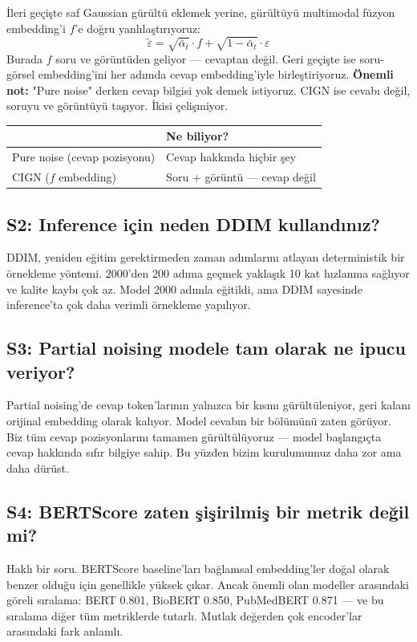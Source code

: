 \documentclass[12pt, a4paper]{article}
\begin{document}
İleri geçişte saf Gaussian gürültü eklemek yerine, gürültüyü multimodal füzyon embedding'i $f$'e doğru yanlılaştırıyoruz:
\[
\tilde{\varepsilon} = \sqrt{\bar{\alpha}_t} \cdot f + \sqrt{1-\bar{\alpha}_t} \cdot \varepsilon
\]
Burada $f$ soru ve görüntüden geliyor — cevaptan değil. Geri geçişte ise soru-görsel embedding'ini her adımda cevap embedding'iyle birleştiriyoruz. \textbf{Önemli not:} "Pure noise" derken cevap bilgisi yok demek istiyoruz. CIGN ise cevabı değil, soruyu ve görüntüyü taşıyor. İkisi çelişmiyor.

\begin{center}
\begin{tabular}{ll}
\toprule
& Ne biliyor? \\
\midrule
Pure noise (cevap pozisyonu) & Cevap hakkında hiçbir şey \\
CIGN ($f$ embedding) & Soru + görüntü — cevap değil \\
\bottomrule
\end{tabular}
\end{center}

\subsection*{S2: Inference için neden DDIM kullandınız?}

DDIM, yeniden eğitim gerektirmeden zaman adımlarını atlayan deterministik bir örnekleme yöntemi. 2000'den 200 adıma geçmek yaklaşık 10 kat hızlanma sağlıyor ve kalite kaybı çok az. Model 2000 adımla eğitildi, ama DDIM sayesinde inference'ta çok daha verimli örnekleme yapılıyor.

\subsection*{S3: Partial noising modele tam olarak ne ipucu veriyor?}

Partial noising'de cevap token'larının yalnızca bir kısmı gürültüleniyor, geri kalanı orijinal embedding olarak kalıyor. Model cevabın bir bölümünü zaten görüyor. Biz tüm cevap pozisyonlarını tamamen gürültülüyoruz — model başlangıçta cevap hakkında sıfır bilgiye sahip. Bu yüzden bizim kurulumumuz daha zor ama daha dürüst.

\subsection*{S4: BERTScore zaten şişirilmiş bir metrik değil mi?}

Haklı bir soru. BERTScore baseline'ları bağlamsal embedding'ler doğal olarak benzer olduğu için genellikle yüksek çıkar. Ancak önemli olan modeller arasındaki göreli sıralama: BERT 0.801, BioBERT 0.850, PubMedBERT 0.871 — ve bu sıralama diğer tüm metriklerde tutarlı. Mutlak değerden çok encoder'lar arasındaki fark anlamlı.
\end{document}
